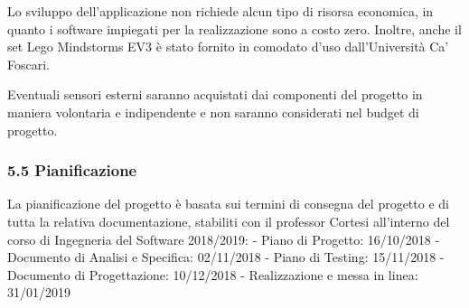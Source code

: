 \documentclass[]{article}
\begin{document}
Lo sviluppo dell'applicazione non richiede alcun tipo di risorsa
economica, in quanto i software impiegati per la realizzazione sono a
costo zero. Inoltre, anche il set Lego Mindstorms EV3 è stato fornito in
comodato d'uso dall'Università Ca' Foscari.

Eventuali sensori esterni saranno acquistati dai componenti del progetto
in maniera volontaria e indipendente e non saranno considerati nel
budget di progetto.

\hypertarget{pianificazione}{%
\subsubsection{5.5 Pianificazione}\label{pianificazione}}

La pianificazione del progetto è basata sui termini di consegna del
progetto e di tutta la relativa documentazione, stabiliti con il
professor Cortesi all'interno del corso di Ingegneria del Software
2018/2019: - Piano di Progetto: 16/10/2018 - Documento di Analisi e
Specifica: 02/11/2018 - ­Piano di Testing: 15/11/2018 - Documento di
Progettazione: 10/12/2018 - Realizzazione e messa in linea: 31/01/2019
\end{document}
